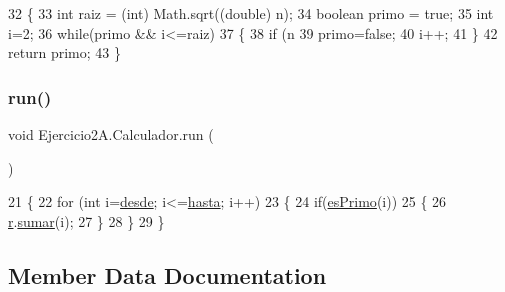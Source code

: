 \begin{DoxyCode}
32     \{
33         \textcolor{keywordtype}{int} raiz = (int) Math.sqrt((\textcolor{keywordtype}{double}) n);
34         \textcolor{keywordtype}{boolean} primo = \textcolor{keyword}{true};
35         \textcolor{keywordtype}{int} i=2;
36         \textcolor{keywordflow}{while}(primo && i<=raiz)
37         \{
38             \textcolor{keywordflow}{if} (n %
39                 primo=\textcolor{keyword}{false};
40             i++;
41         \}
42         \textcolor{keywordflow}{return} primo;
43     \}
\end{DoxyCode}
\mbox{\label{class_ejercicio2_a_1_1_calculador_a08d293ab17364b4114ef07762e29dc27}} 
\subsubsection{\texorpdfstring{run()}{run()}}
{\footnotesize\ttfamily void Ejercicio2\+A.\+Calculador.\+run (\begin{DoxyParamCaption}{ }\end{DoxyParamCaption})\hspace{0.3cm}{\ttfamily [inline]}}


\begin{DoxyCode}
21     \{
22         \textcolor{keywordflow}{for} (\textcolor{keywordtype}{int} i=\mbox{\hyperlink{class_ejercicio2_a_1_1_calculador_a6ebfdfea1d0c6653247acb86c26a1074}{desde}}; i<=\mbox{\hyperlink{class_ejercicio2_a_1_1_calculador_adf1394308939996bb06ea2f9aaedb9ca}{hasta}}; i++)
23         \{
24             \textcolor{keywordflow}{if}(\mbox{\hyperlink{class_ejercicio2_a_1_1_calculador_a6036c26ba5a2d108d6316dc3ad2c52d2}{esPrimo}}(i))
25             \{
26                 \mbox{\hyperlink{class_ejercicio2_a_1_1_calculador_aca421155f90fac2acf41c69639bbd940}{r}}.\mbox{\hyperlink{class_ejercicio2_a_1_1_resultado_a72ea26b269e45dcf10697761fd351d76}{sumar}}(i);
27             \}
28         \}
29     \}
\end{DoxyCode}


\subsection{Member Data Documentation}
\mbox{\label{class_ejercicio2_a_1_1_calculador_a6ebfdfea1d0c6653247acb86c26a1074}} 
